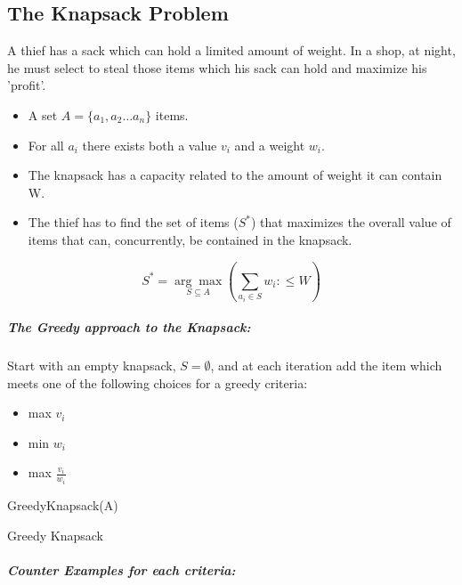\documentclass[12pt,letterpaper]{article}
\begin{document}
\subsection{The Knapsack Problem}
A thief has a sack which can hold a limited amount of weight. In a shop, at night, he must select to steal those items which his sack can hold and maximize his 'profit'.\\
\begin{itemize}
\item A set $A=\{a_1, a_2 \dots a_n\}$ items.
\item For all $a_i$ there exists both a value $v_i$ and a weight
 $w_i$.
\item The knapsack has a capacity related to the amount of weight it can contain W.
\item  The thief has to find the set of items ($S^*$) that maximizes the overall value of items that can, concurrently, be contained in the knapsack.
\end{itemize}
\[ S^*=\underset{S\subseteq A}{\arg\max}(\sum_{a_i \in S}w_i:\leq W) \]
\subparagraph{The Greedy approach to the Knapsack:}
Start with an empty knapsack, $S=\emptyset$, and at each iteration add the item which meets one of the following choices for a greedy criteria:
\begin{itemize}
\item max $v_i$
\item min $w_i$
\item max $\frac{v_i}{w_i}$
\end{itemize}
\begin{algorithm}[h]
GreedyKnapsack(A)
\caption{Greedy Knapsack}
\label{Greedy Knapsack}
\end{algorithm}
\subparagraph{Counter Examples for each criteria:} 
\end{document}
